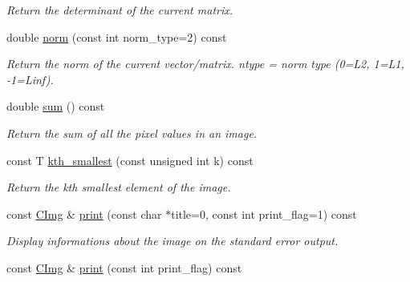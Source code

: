 \begin{DoxyCompactItemize}
\begin{DoxyCompactList}\small\item\em Return the determinant of the current matrix. \end{DoxyCompactList}\item 
\hypertarget{structcimg__library_1_1_c_img_a9e085d33be58bdfb6733a8ebbb7cc9fd}{double \hyperlink{structcimg__library_1_1_c_img_a9e085d33be58bdfb6733a8ebbb7cc9fd}{norm} (const int norm\-\_\-type=2) const }\label{structcimg__library_1_1_c_img_a9e085d33be58bdfb6733a8ebbb7cc9fd}

\begin{DoxyCompactList}\small\item\em Return the norm of the current vector/matrix. {\ttfamily ntype} = norm type (0=L2, 1=L1, -\/1=Linf). \end{DoxyCompactList}\item 
\hypertarget{structcimg__library_1_1_c_img_acd9c40e2d6889b9eae6b330a5045371d}{double \hyperlink{structcimg__library_1_1_c_img_acd9c40e2d6889b9eae6b330a5045371d}{sum} () const }\label{structcimg__library_1_1_c_img_acd9c40e2d6889b9eae6b330a5045371d}

\begin{DoxyCompactList}\small\item\em Return the sum of all the pixel values in an image. \end{DoxyCompactList}\item 
\hypertarget{structcimg__library_1_1_c_img_ac37f8186597093b8965a233fe191159d}{const T \hyperlink{structcimg__library_1_1_c_img_ac37f8186597093b8965a233fe191159d}{kth\-\_\-smallest} (const unsigned int k) const }\label{structcimg__library_1_1_c_img_ac37f8186597093b8965a233fe191159d}

\begin{DoxyCompactList}\small\item\em Return the kth smallest element of the image. \end{DoxyCompactList}\item 
const \hyperlink{structcimg__library_1_1_c_img}{C\-Img} \& \hyperlink{structcimg__library_1_1_c_img_a79c910f70e49d74484d76d64c2302bf3}{print} (const char $\ast$title=0, const int print\-\_\-flag=1) const 
\begin{DoxyCompactList}\small\item\em Display informations about the image on the standard error output. \end{DoxyCompactList}\item 
\hypertarget{structcimg__library_1_1_c_img_a5b3f7335c1f79793de9fe21c041f3820}{const \hyperlink{structcimg__library_1_1_c_img}{C\-Img} \& \hyperlink{structcimg__library_1_1_c_img_a5b3f7335c1f79793de9fe21c041f3820}{print} (const int print\-\_\-flag) const }\label{structcimg__library_1_1_c_img_a5b3f7335c1f79793de9fe21c041f3820}


\end{DoxyCompactItemize}
